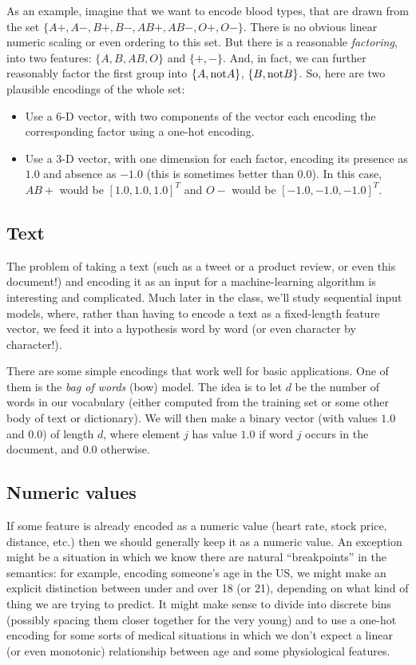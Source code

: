 As an example, imagine that we want to encode blood types, that are
drawn from the set $\{A+, A-, B+, B-, AB+, AB-, O+, O-\}$.  There is
no obvious linear numeric scaling or even ordering to this set.  But
there is a reasonable {\em factoring}, into two features: $\{A, B, AB,
  O\}$ and $\{+, -\}$.  And, in fact, we can further reasonably factor
the first group into $\{A, {\rm not}A\}$, $\{B, {\rm not}B\}$.  So, here are two plausible encodings
of the whole set:
\begin{itemize}
  \item Use a 6-D vector, with two components of the vector each encoding the
        corresponding factor using a one-hot encoding.
  \item Use a 3-D vector, with one dimension for each factor, encoding
        its presence as $1.0$ and absence as $-1.0$ (this is sometimes
        better than $0.0$).  In this case, $AB+$ would be $[1.0, 1.0, 1.0]^T$
        and $O-$ would be $[-1.0, -1.0, -1.0]^T$.
\end{itemize}

\subsection{Text}
The problem of taking a text (such as a tweet or a product review, or
even this document!) and encoding it as an input for a
machine-learning algorithm is interesting and complicated.  Much later
in the class, we'll study sequential input models, where, rather than
having to encode a text as a fixed-length feature vector, we feed it
into a hypothesis word by word (or even character by character!).

There are some simple encodings that work well for basic
applications.  One of them is the {\em bag of words} ({\sc bow})
model.  The idea is to let $d$ be the number of words in our
vocabulary (either computed from the training set or some other body
of text or dictionary).  We will then make a binary vector (with
values $1.0$ and $0.0$) of length $d$, where element $j$ has value
$1.0$ if word $j$ occurs in the document, and $0.0$ otherwise.

\subsection{Numeric values}
\label{realFeatures}
If some feature is already encoded as a numeric value (heart rate,
stock price, distance, etc.) then we should generally keep it as a
numeric value.   An exception might be a situation in which we know
there are natural ``breakpoints'' in the semantics:  for example,
encoding someone's age in the US, we might make an explicit
distinction between under and over 18 (or 21), depending on what kind
of thing we are trying to predict.   It might make sense to divide
into discrete bins (possibly spacing them closer together for the very
young) and to use a one-hot encoding for some sorts of medical situations
in which we don't expect a linear (or even monotonic) relationship
between age and some physiological features.

